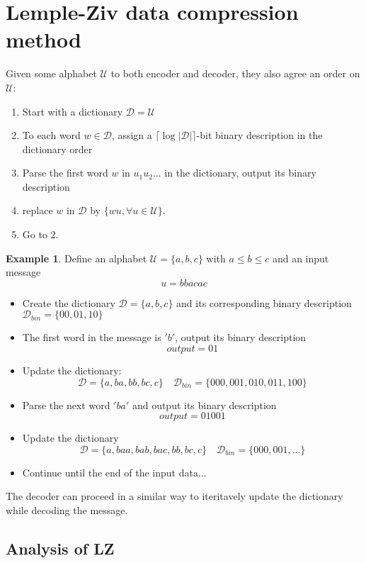 \documentclass[twoside]{article}
\theoremstyle{definition} %
\newtheorem{example}{Example}
\def\D{\mathcal{D}}
\def\U{\mathcal{U}}
\begin{document}


\cleardoublepage
\section{Lemple-Ziv data compression method}

Given some alphabet $\U$ to both encoder and decoder, they also agree an order on $\U$:

\begin{enumerate}
  \item Start with a dictionary $\D = \U$
  \item To each word $w \in \D$, assign a $\lceil \log |\D| \rceil $-bit binary description in the dictionary order
  \item Parse the first word $w$ in $u_1 u_2 ...$ in the dictionary, output its binary description
  \item replace $w$ in $\D$ by $\{ wu, \forall u \in \U \}$.
  \item Go to 2.
\end{enumerate}

\begin{example}
  Define an alphabet $\U = \{a, b, c\}$ with $a \leq b \leq c$ and an input message
  $$ u = b b a c a c $$
  \begin{itemize}
    \item Create the dictionary $\D = \{a, b, c\}$ and its corresponding binary description $\D_{bin} = \{00, 01, 10\}$
    \item The first word in the message is $'b'$, output its binary description
    $$ output = 01 $$
    \item Update the dictionary:
    $$ \D = \{a, ba, bb, bc , c\} \quad \D_{bin} = \{000, 001, 010, 011, 100\} $$
    \item Parse the next word $'ba'$ and output its binary description
    $$ output = 01 001 $$
    \item Update the dictionary
    $$ \D = \{a, baa, bab, bac, bb, bc , c\} \quad \D_{bin} = \{000, 001, ...\} $$
    \item Continue until the end of the input data...
  \end{itemize}
  The decoder can proceed in a similar way to iteritavely update the dictionary while decoding the message.
\end{example}

\subsection{Analysis of LZ}
\end{document}
